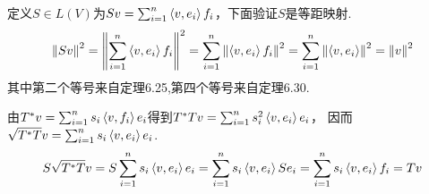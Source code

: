 定义\(S \in L(V)\)为\(Sv=\sum_{i=1}^n \ip{v}{e_i}f_i\)，下面验证\(S\)是等距映射.
    \begin{align*}
        \norm{Sv}^2=\norm{\sum_{i=1}^n \ip{v}{e_i}f_i}^2=\sum_{i=1}^n \norm{\ip{v}{e_i}f_i}^2
        =\sum_{i=1}^n \norm{\ip{v}{e_i}}^2=\norm{v}^2
    \end{align*}
其中第二个等号来自定理6.25,第四个等号来自定理6.30.

由\(T^*v=\sum_{i=1}^n s_i\ip{v}{f_i}e_i\)得到\(T^*Tv=\sum_{i=1}^n s_i^2 \ip{v}{e_i}e_i\)，
因而\(\sqrt{T^*T}v=\sum_{i=1}^n s_i\ip{v}{e_i}e_i\).
    \begin{align*}
        S\sqrt{T^*T}v=S\sum_{i=1}^n s_i\ip{v}{e_i}e_i=\sum_{i=1}^n s_i\ip{v}{e_i}Se_i
        =\sum_{i=1}^n s_i\ip{v}{e_i}f_i=Tv
    \end{align*}

